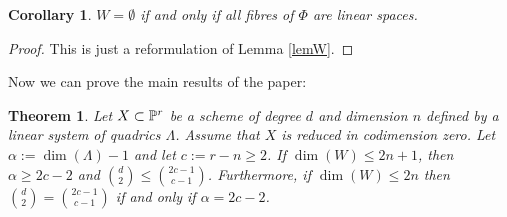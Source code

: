 \documentclass{amsart}
\newtheorem{theorem}{Theorem}
\newtheorem{corollary}{Corollary}
\theoremstyle{definition}
\begin{document}
\begin{corollary}
\label{corlin} $W=\emptyset$ if and only if all fibres of $\Phi $
are linear spaces.
\end{corollary}

\begin{proof}
This is just a reformulation of Lemma \ref{lemW}.
\end{proof}

Now we can prove the main results of the paper:

\begin{theorem}
\label{teofond} Let $X\subset\Bbb{P}^{r}$ be a scheme of degree $d$
and dimension $n$ defined by a linear system of quadrics $\Lambda$.
Assume that $X$ is reduced in codimension zero. Let
$\alpha:=\dim(\Lambda)-1$ and let $c:=r-n\geq 2$. If $\dim(W)\leq
2n+1$, then $\alpha \geq 2c-2$ and $\binom{d}{2}\leq
\binom{2c-1}{c-1}$. Furthermore, if $\dim(W)\leq
2n$ then $\binom{d}{2}=\binom{2c-1}{c-1}$ if
and only if $\alpha=2c-2$.
\end{theorem}
\end{document}
